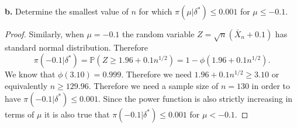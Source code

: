 \documentclass{article}
\renewcommand{\P}[1]{\mathbb{P}\left(#1\right)}
\newenvironment{hwproof}[1]
{
    #1
    \begin{proof}
}{
    \end{proof}
}
\begin{document}
\begin{hwproof}
    {
        \textbf{b.} Determine the smallest value of $n$ for which
        $\pi(\mu | \delta^*) \leq 0.001$ for $\mu \leq -0.1$.
    }
    Similarly, when $\mu = -0.1$ the random variable $Z = \sqrt{n}(\bar{X}_n + 0.1)$
    has standard normal distribution. Therefore
    \begin{equation*}
        \pi(-0.1 | \delta^*) = \P{Z \geq 1.96 + 0.1n^{1/2}}
        = 1 - \phi(1.96 + 0.1n^{1/2}).
    \end{equation*}
    We know that $\phi(3.10) = 0.999$. Therefore we need $1.96 + 0.1n^{1/2} \geq 3.10$
    or equivalently $n \geq 129.96$. Therefore we need a sample size of $n=130$ in
    order to have $\pi(-0.1 | \delta^*) \leq 0.001$. Since the power function is also
    strictly increasing in terms of $\mu$ it is also true that
    $\pi(-0.1 | \delta^*) \leq 0.001$ for $\mu < -0.1$.
\end{hwproof}
\end{document}
